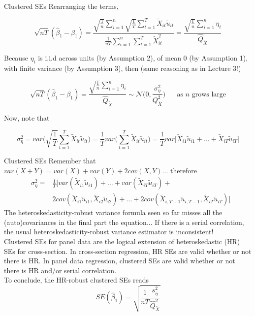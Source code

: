 \documentclass[notes,10pt, aspectratio=169]{beamer}
\begin{document}
\begin{frame}{Clustered SEs}
Rearranging the terms,

    \begin{equation*}
        \sqrt{nT}(\hat{\beta}_1 - \beta_1)  = \frac{\sqrt{\frac{1}{n}}\sum_{i=1}^n \sqrt{\frac{1}{T}} \sum_{t=1}^T 
 \tilde{X}_{it} \tilde{u}_{it} }{\frac{1}{nT} \sum_{i=1}^n\sum_{t=1}^T  \tilde{X}_{it}^2}  = \frac{\sqrt{\frac{1}{n}}\sum_{i=1}^n \eta_i }{\hat{Q}_{\tilde{X}}}
    \end{equation*}

Because $\eta_i$ is i.i.d across units (by Assumption 2), of mean 0 (by Assumption 1), with finite variance (by Assumption 3), then (same reasoning as in Lecture 3!)

    \begin{equation*}
  \sqrt{nT}(\hat{\beta}_1 - \beta_1)  = \frac{\sqrt{\frac{1}{n}}\sum_{i=1}^n \eta_i }{\hat{Q}_{\tilde{X}}} \sim \mathcal{N}\Big(0, \frac{\sigma_\eta^2}{{Q}_{\tilde{X}}^2} \Big) \text{~~~~ as $n$ grows large}
    \end{equation*}

Now, note that

\begin{equation*}
    \sigma_\eta^2 = var\Bigg(\sqrt{\frac{1}{T}} \sum_{t=1}^T 
 \tilde{X}_{it} \tilde{u}_{it}\Bigg) = \frac{1}{T} var\Big(\sum_{t=1}^T 
 \tilde{X}_{it} \tilde{u}_{it}\Big) = \frac{1}{T} var\Big[\tilde{X}_{i1} \tilde{u}_{i1}+\dots+ \tilde{X}_{iT} \tilde{u}_{iT}\Big]
\end{equation*}
\end{frame}

\begin{frame}{Clustered SEs}
Remember that $var(X + Y) = var(X) + var(Y) + 2cov(X,Y)$... therefore
\begin{eqnarray*}
    &\sigma_\eta^2 = &\frac{1}{T} \Big[var(\tilde{X}_{i1} \tilde{u}_{i1})+\dots+ var(\tilde{X}_{iT} \tilde{u}_{iT}) +\\
    & &2cov(\tilde{X}_{i1} \tilde{u}_{i1}, \tilde{X}_{i2} \tilde{u}_{i2}) + \dots + 2cov(\tilde{X}_{i,T-1} \tilde{u}_{i,T-1}, \tilde{X}_{iT} \tilde{u}_{iT}) \Big]
\end{eqnarray*}
The heteroskedasticity-robust variance formula seen so far misses all the (auto)covariances in the final part the equation... If there is a serial correlation, the usual heteroskedasticity-robust variance estimator is inconsistent!\\[1em]

Clustered SEs for panel data are the logical extension of heteroskedastic (HR) SEs for cross-section. In cross-section regression, HR SEs are valid whether or not there is HR. In panel data regression, clustered SEs are valid whether or not there is HR and/or serial correlation.\\[1em]

To conclude, the HR-robust clustered SEs reads
\begin{equation*}
    SE(\hat{\beta}_1)=\sqrt{\frac{1}{nT}\frac{s_{\hat{\eta}}^2}{\hat{Q}_{\tilde{X}}^2}}
\end{equation*}

\end{frame}
\end{document}
